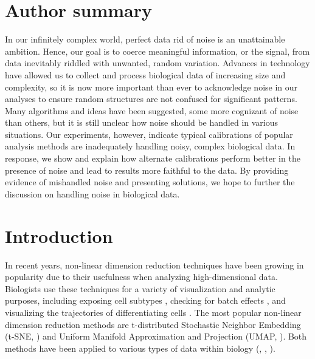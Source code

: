 \documentclass[10pt,letterpaper]{article}
\begin{document}
\section*{Author summary}
In our infinitely complex world, perfect data rid of noise is an unattainable ambition. Hence, our goal is to coerce meaningful information, or the signal, from data inevitably riddled with unwanted, random variation. Advances in technology have allowed us to collect and process biological data of increasing size and complexity, so it is now more important than ever to acknowledge noise in our analyses to ensure random structures are not confused for significant patterns. Many algorithms and ideas have been suggested, some more cognizant of noise than others, but it is still unclear how noise should be handled in various situations. Our experiments, however, indicate typical calibrations of popular analysis methods are inadequately handling noisy, complex biological data. In response, we show and explain how alternate calibrations perform better in the presence of noise and lead to results more faithful to the data. By providing evidence of mishandled noise and presenting solutions, we hope to further the discussion on handling noise in biological data.

\linenumbers

\section*{Introduction}
In recent years, non-linear dimension reduction techniques have been growing in popularity due to their usefulness when analyzing high-dimensional data. Biologists use these techniques for a variety of visualization and analytic purposes, including exposing cell subtypes \cite{t-SNE example}, checking for batch effects \cite{SVD example}, and visualizing the trajectories of differentiating cells \cite{PHATE}. The most popular non-linear dimension reduction methods are t-distributed Stochastic Neighbor Embedding (t-SNE, \cite{t-SNE}) and Uniform Manifold Approximation and Projection (UMAP, \cite{umap}). Both methods have been applied to various types of data within biology (\cite{t-SNE example}, \cite{UMAP example}, \cite{t-SNE/UMAP example}). 
\end{document}

